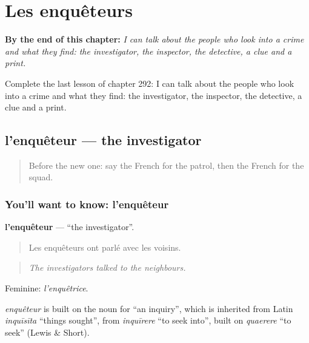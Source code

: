 
\chapter{Les enquêteurs}
\label{ch:fr-les-enqueteurs}

\begin{chapteropening}
\textbf{By the end of this chapter:} \emph{I can talk about the people who look into a crime and what they find: the investigator, the inspector, the detective, a clue and a print.}

Complete the last lesson of chapter 292: I can talk about the people who look into a crime and what they find: the investigator, the inspector, the detective, a clue and a print.
\end{chapteropening}

\section[l'enquêteur]{l'enquêteur — the investigator}

\label{lesson:FR-C292-enqueteur}



\begin{quote}
Before the new one: say the French for the patrol, then the French for the squad.
\end{quote}

\subsection*{You'll want to know: l'enquêteur}
\textbf{l'enquêteur} — \textquotedblleft{}the investigator\textquotedblright{}.

\begin{quote}
Les enquêteurs ont parlé avec les voisins.
\end{quote}

\begin{quote}
\emph{The investigators talked to the neighbours.}
\end{quote}

Feminine: \emph{l'enquêtrice}.

\begin{cousinweb}
\emph{enquêteur} is built on the noun for \textquotedblleft{}an inquiry\textquotedblright{}, which is inherited from Latin \emph{inquīsīta} \textquotedblleft{}things sought\textquotedblright{}, from \emph{inquīrere} \textquotedblleft{}to seek into\textquotedblright{}, built on \emph{quaerere} \textquotedblleft{}to seek\textquotedblright{} (Lewis \& Short).
\end{cousinweb}

